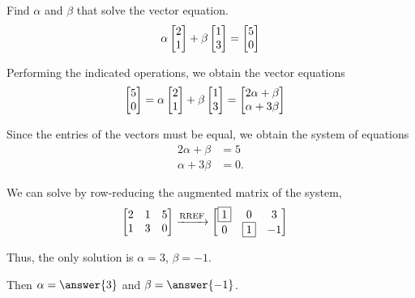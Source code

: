 \documentclass{ximera}
\author{Chris Black}
\begin{document}
\begin{exercise}
  Find $\alpha$ and $\beta$ that solve the vector equation.
  \[
    \alpha\begin{bmatrix}2\\1\end{bmatrix}+
    \beta\begin{bmatrix}1\\3
    \end{bmatrix}=
    \begin{bmatrix}5\\0\end{bmatrix}
  \]

  \begin{hint}
    Performing the indicated operations, we obtain the vector equations
    \begin{align*}
      \begin{bmatrix}5\\0\end{bmatrix}
   &= \alpha\begin{bmatrix}2\\1\end{bmatrix} + \beta\begin{bmatrix}1\\3\end{bmatrix}
      = \begin{bmatrix}2\alpha + \beta \\ \alpha + 3\beta\end{bmatrix}
    \end{align*}
  \end{hint}

  \begin{hint}
    Since the entries of the vectors must be equal, we obtain the system of equations
    \begin{align*}
      2\alpha + \beta &= 5\\
      \alpha + 3\beta &= 0.
    \end{align*}
  \end{hint}
    
  \begin{hint}
    We can solve by row-reducing the augmented matrix of the system,
    \begin{align*}
      \begin{bmatrix}
        2 & 1 & 5\\
        1 & 3 & 0
      \end{bmatrix}
          &\xrightarrow{\text{RREF}}
            \begin{bmatrix}
              \fbox{1} & 0 & 3\\
              0 & \fbox{1} & -1
            \end{bmatrix}
    \end{align*}
  \end{hint}
  
  \begin{hint}
    Thus, the only solution is $\alpha = 3$, $\beta = -1$.
  \end{hint}

  Then $\alpha = \answer{3}$ and $\beta = \answer{-1}$.

\end{exercise}
\end{document}
